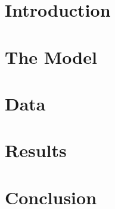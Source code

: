 \section{Introduction}






\section{The Model}

\section{Data}

\section{Results}

\section{Conclusion}
\cite{08332}
\clearpage
\pagebreak
